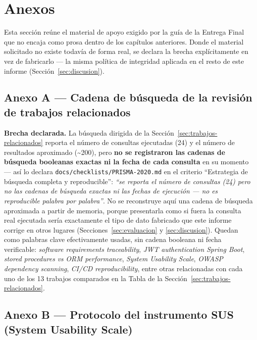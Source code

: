 \section{Anexos}

Esta sección reúne el material de apoyo exigido por la guía de la Entrega Final que no encaja como
prosa dentro de los capítulos anteriores. Donde el material solicitado no existe todavía de forma real,
se declara la brecha explícitamente en vez de fabricarlo --- la misma política de integridad aplicada en
el resto de este informe (Sección~\ref{sec:discusion}).

\subsection{Anexo A --- Cadena de búsqueda de la revisión de trabajos relacionados}
\label{anexo:busqueda}

\textbf{Brecha declarada.} La búsqueda dirigida de la Sección~\ref{sec:trabajos-relacionados} reporta el
número de consultas ejecutadas (24) y el número de resultados aproximado (\textasciitilde200), pero
\textbf{no se registraron las cadenas de búsqueda booleanas exactas ni la fecha de cada consulta} en su
momento --- así lo declara \texttt{docs/checklists/PRISMA-2020.md} en el criterio ``Estrategia de
búsqueda completa y reproducible'': \textit{``se reporta el número de consultas (24) pero no las
cadenas de búsqueda exactas ni las fechas de ejecución --- no es reproducible palabra por palabra''}. No
se reconstruye aquí una cadena de búsqueda aproximada a partir de memoria, porque presentarla como si
fuera la consulta real ejecutada sería exactamente el tipo de dato fabricado que este informe corrige en
otros lugares (Secciones~\ref{sec:evaluacion} y \ref{sec:discusion}). Quedan como palabras clave
efectivamente usadas, sin cadena booleana ni fecha verificable: \textit{software requirements
traceability}, \textit{JWT authentication Spring Boot}, \textit{stored procedures vs ORM performance},
\textit{System Usability Scale}, \textit{OWASP dependency scanning}, \textit{CI/CD reproducibility},
entre otras relacionadas con cada uno de los 13 trabajos comparados en la Tabla de la
Sección~\ref{sec:trabajos-relacionados}.

\subsection{Anexo B --- Protocolo del instrumento SUS (System Usability Scale)}
\label{anexo:sus}

